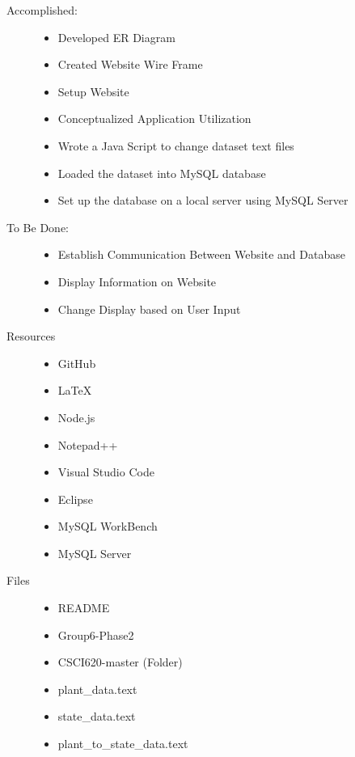 \documentclass{Group6_Phase2}
\begin{document}
\begin{description}
	\item[Accomplished:] \hfill
	\begin{itemize}
		\item Developed ER Diagram
		\item Created Website Wire Frame
		\item Setup Website
		\item Conceptualized Application Utilization
		\item Wrote a Java Script to change dataset text files
		\item Loaded the dataset into MySQL database
		\item Set up the database on a local server using MySQL Server
	\end{itemize}
	
	\item[To Be Done:] \hfill
	\begin{itemize}
		\item Establish Communication Between Website and Database
		\item Display Information on Website
		\item Change Display based on User Input
	\end{itemize}
	
	\item[Resources] \hfill
	\begin{itemize}
		\item GitHub
		\item LaTeX
		\item Node.js
		\item Notepad++
		\item Visual Studio Code
		\item Eclipse
		\item MySQL WorkBench
		\item MySQL Server
	\end{itemize}
	
	\item[Files] \hfill
	\begin{itemize}
		\item README
		\item Group6-Phase2
		\item CSCI620-master (Folder)
		\item plant\_data.text
		\item state\_data.text
		\item plant\_to\_state\_data.text
	\end{itemize}
\end{description}
\end{document}
